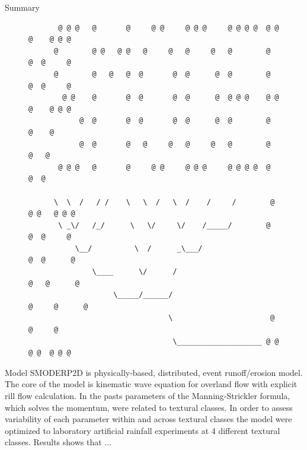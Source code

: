 




\begin{alertblock}{Summary}
  \begin{figure}
    \begin{minipage}{\dimexpr\linewidth-2\fboxrule-2\fboxsep}
    {\tiny
    \begin{lstlisting}
       @ @ @   @       @     @ @     @ @ @     @ @ @ @  @ @ @    @ @ @
      @        @ @   @ @   @     @   @     @   @        @     @  @     @
      @        @   @   @  @       @  @      @  @        @     @  @     @
        @ @    @       @  @       @  @      @  @ @ @    @ @ @    @ @ @
            @  @       @  @       @  @      @  @        @   @    @
            @  @       @   @     @   @     @   @        @    @   @
       @ @ @   @       @     @ @     @ @ @     @ @ @ @  @     @  @

      \  \  /   / /    \   \  /   \  /    /     /        @ @ @   @ @ @
       \ _\/   /_/      \   \/     \/    /_____/        @     @  @     @
           \__/          \  /      _\___/                     @  @      @
               \____      \/      /                          @   @      @
                    \_____/______/                         @     @      @
                                 \                       @       @     @
                                  \____________________ @ @ @ @  @ @ @
    \end{lstlisting}
    }
    \end{minipage}
  \end{figure}
  Model SMODERP2D is phy\-sically-based, distributed, event runoff/erosion model. The core of the model is kinematic wave equation for overland flow with explicit rill flow calculation. 
  In the pasts parameters of the Manning-Strickler formula, which solves the momentum, were related to textural classes. 
  In order to assess variability of each parameter within and across textural classes the model were optimized to laboratory artificial rainfall experiments at 4 different textural classes.
  Results shows that ...
\end{alertblock}\vspace{0.9cm}





